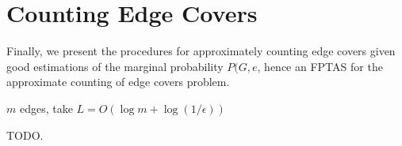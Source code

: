 \section{Counting Edge Covers}

Finally, we present the procedures for approximately counting edge covers given good estimations of the marginal probability $P(G,e$, hence an FPTAS for the approximate counting of edge covers problem.



$m$ edges, 
take $L=O(\log m + \log(1/ \epsilon))$

TODO.

